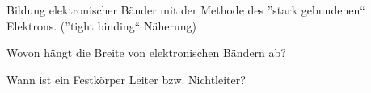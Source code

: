 \documentclass[a5paper,12pt,ngerman,grid=front %
,print
]{kartei}
\begin{document}
	\begin{karte}{
		Bildung elektronischer Bänder mit der Methode des ”stark gebundenen“ Elektrons. 
		(”tight binding“ Näherung)
		}
		
		
		
	\end{karte}


	\begin{karte}{
		Wovon hängt die Breite von elektronischen Bändern ab?
		}
		
		
		
	\end{karte}


	\begin{karte}{
		Wann ist ein Festkörper Leiter bzw. Nichtleiter?
		}
		
		
		
	\end{karte}

\end{document}
